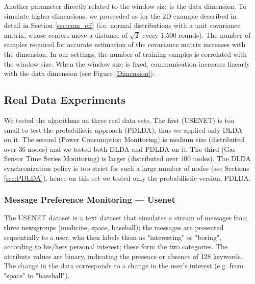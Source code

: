 Another parameter directly related to the window size is the data dimension. To simulate higher dimensions, we proceeded as for the
2D example described in detail in Section \ref{sec:com_eff} (i.e. normal distributions with a unit covariance matrix, whose centers move a distance of $\sqrt{2}$ every
1,500 rounds).
The number of 
samples required for accurate estimation of the covariance matrix increases with the dimension. In our 
settings, the number of training samples is correlated with the window size. When the window size is fixed, 
communication increases linearly with the data dimension (see Figure \ref{Dimension}).
  
%
%

\subsection{Real Data Experiments}
\label{sec:real}
We tested the algorithms on three real data sets. The first
(USENET) is too small to test the probabilistic approach (PDLDA); thus we applied
only DLDA on it.
The second (Power Consumption Monitoring) is medium size  
(distributed over 36 nodes) and we tested both DLDA and PDLDA on it.
The third (Gas Sensor Time Series Monitoring) is larger (distributed over
100 nodes). The DLDA synchronization policy is too strict for such a large number of nodes
(see Sections \ref{sec:PDLDA}),
hence on this set we tested only the probabilistic version, PDLDA.
%
\subsubsection{Message Preference Monitoring --- Usenet}
The USENET dataset \cite{usenet} is a text dataset that simulates a stream of messages 
from three newsgroups (medicine, space, baseball); 
the messages are presented sequentially to a user, who then labels them as "interesting" or "boring", 
according to his/hers personal interest; these form the two categories.
The attribute values are binary, indicating the presence or absence of 128 keywords. 
The change in the data corresponds to a change in the user's interest (e.g. from "space" to "baseball"). 

